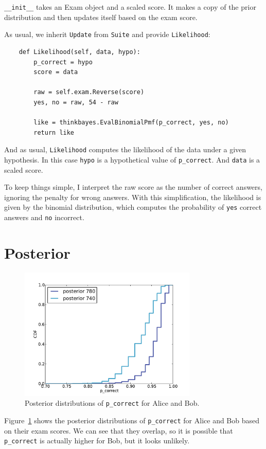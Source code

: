 \documentclass[12pt]{book}
\begin{document}
\verb"__init__" takes an Exam object and a scaled score.  It makes a
copy of the prior distribution and then updates itself based on the
exam score.

As usual, we inherit {\tt Update} from {\tt Suite} and provide
{\tt Likelihood}:

\begin{verbatim}
    def Likelihood(self, data, hypo):
        p_correct = hypo
        score = data

        raw = self.exam.Reverse(score)
        yes, no = raw, 54 - raw

        like = thinkbayes.EvalBinomialPmf(p_correct, yes, no)
        return like
\end{verbatim}

And as usual, {\tt Likelihood} computes the likelihood of the data
under a given hypothesis.  In this case {\tt hypo} is a hypothetical
value of \verb"p_correct".  And {\tt data} is a scaled score.

To keep things simple, I interpret the raw score as the number of
correct answers, ignoring the penalty for wrong answers.  With
this simplification, the likelihood is given by the binomial
distribution, which computes the probability of {\tt yes} correct
answers and {\tt no} incorrect.


\section{Posterior}

\begin{figure}
\centerline{\includegraphics[height=2.5in]{figs/sat_posteriors_p_corr.pdf}}
\caption{Posterior distributions of {\tt p\_correct} for Alice and Bob.}
\label{fig.satposterior1}
\end{figure}

Figure~\ref{fig.satposterior1} shows the posterior distributions
of \verb"p_correct" for Alice and Bob based on their exam scores.
We can see that they overlap, so it is possible that \verb"p_correct"
is actually higher for Bob, but it looks unlikely.
\end{document}
